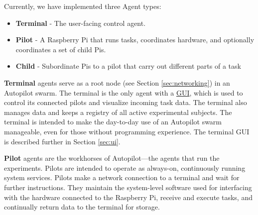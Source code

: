 \documentclass[nohyper, justified, notitlepage, marginals=raggedright,twoside=false,debug]{tufte-autopilot}
\begin{document}
\clearpage

Currently, we have implemented three Agent types: 

\begin{itemize}
    \item \textbf{Terminal} - The user-facing control agent.
    \item \textbf{Pilot} - A Raspberry Pi that runs tasks, coordinates hardware, and optionally coordinates a set of child Pis.
    \item \textbf{Child} - Subordinate Pis to a pilot that carry out different parts of a task
\end{itemize}

\textbf{Terminal} agents serve as a root node (see Section \ref{sec:networking}) in an Autopilot swarm. The terminal is the only agent with a \hyperref[sec:ui]{GUI}, which is used to control its connected pilots and visualize incoming task data. The terminal also manages data and keeps a registry of all active experimental subjects. The terminal is intended to make the day-to-day use of an Autopilot swarm manageable, even for those without programming experience. The terminal GUI is described further in Section \ref{sec:ui}.

\textbf{Pilot} agents are the workhorses of Autopilot---the agents that run the experiments. Pilots are intended to operate as always-on, continuously running system services. Pilots make a network connection to a terminal and wait for further instructions. They maintain the system-level software used for interfacing with the hardware connected to the Raspberry Pi, receive and execute tasks, and continually return data to the terminal for storage. 
\end{document}
